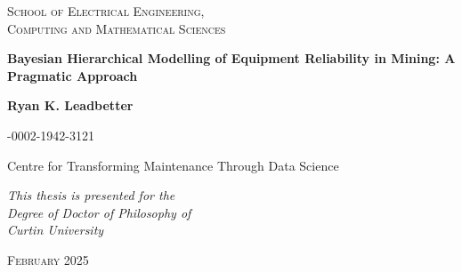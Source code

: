 \begin{titlepage}

    \begin{center}
        \Large\scshape
        School of Electrical Engineering,\\Computing and Mathematical Sciences
    \end{center}

    \vfill
    \vspace{3\baselineskip}

    \begin{center}
        \Huge\bfseries
        Bayesian Hierarchical Modelling of Equipment Reliability in Mining: A Pragmatic Approach
    \end{center}

    \vfill
    \vspace{3\baselineskip}

    \begin{center}
        \huge\bfseries
        Ryan K. Leadbetter

        \Large{}-0002-1942-3121
    \end{center}

    \vfill
    \vspace{3\baselineskip}

    \begin{center}
        \large
        Centre for Transforming Maintenance Through Data Science
    \end{center}

    \vfill

    \begin{center}
        \large\itshape
        This thesis is presented for the\\
        Degree of Doctor of Philosophy of\\
        Curtin University
    \end{center}

    \vfill

    \begin{center}
        \Large
        \textsc{February 2025}
    \end{center}

    \cleardoublepage
\end{titlepage}

